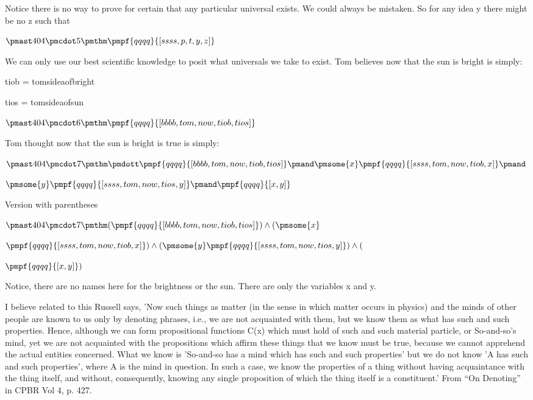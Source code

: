 \documentclass[12pt]{article}
\begin{document}
Notice there is no way to prove for certain that any particular universal exists. We could always be mistaken. So for any idea y there might be no z such that

$\pmast 404 \pmcdot 5 \pmthm \pmpf{qqqq}{[ssss, p,t,y, z]}$

We can only use our best scientific knowledge to posit what universals we take to exist. Tom believes now that the sun is bright is simply:

tiob = tomsideaofbright

tios = tomsideaofsun

$\pmast 404 \pmcdot 6 \pmthm \pmpf{qqqq}{[bbbb, tom, now, tiob, tios]}$


Tom thought now that the sun is bright is true is simply:

$\pmast 404 \pmcdot 7 \pmthm \pmdott \pmpf{qqqq}{[bbbb,tom,now,tiob,tios]} \pmand \pmsome{x} \pmpf{qqqq}{[ssss,tom,now,tiob,x]} \pmand $

$\pmsome{y} \pmpf{qqqq}{[ssss,tom,now,tios,y]} \pmand \pmpf{qqqq}{[x,y]}$
 
 

Version with parentheses

$\pmast 404 \pmcdot 7 \pmthm  (  \pmpf{qqqq}{[bbbb,tom,now,tiob,tios]} ) \land ( \pmsome{x} $

$\pmpf{qqqq}{[ssss,tom,now,tiob,x]} ) \land ( \pmsome{y} \pmpf{qqqq}{[ssss,tom,now,tios,y]} ) \land ( $

$\pmpf{qqqq}{[x,y]})$



Notice, there are no names here for the brightness or the sun. There are only the variables x and y. 

I believe related to this Russell says, 'Now such things as matter (in the sense in which matter occurs in physics) and the minds of other people are known to us only by denoting phrases, i.e., we are not acquainted with them, but we know them as what has such and such properties. Hence, although we can form propositional functions C(x) which must hold of such and such material particle, or So-and-so's mind, yet we are not acquainted with the propositions which affirm these things that we know must be true, because we cannot apprehend the actual entities concerned. What we know is 'So-and-so has a mind which has such and such properties' but we do not know 'A has such and such properties', where A is the mind in question. In such a case, we know the properties of a thing without having acquaintance with the thing itself, and without, consequently, knowing any single proposition of which the thing itself is a constituent.' From “On Denoting” in CPBR Vol 4, p. 427.
\end{document}
